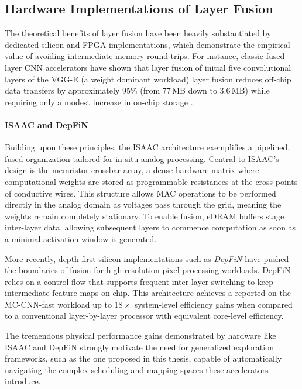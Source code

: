 \subsection{Hardware Implementations of Layer Fusion}

The theoretical benefits of layer fusion have been heavily substantiated by dedicated silicon and FPGA implementations, which demonstrate the empirical value of avoiding intermediate memory round-trips. For instance, classic fused-layer CNN accelerators have shown that layer fusion of initial five convolutional layers of the VGG-E (a weight dominant workload) layer fusion reduces off-chip data transfers by approximately 95\% (from 77\,MB down to 3.6\,MB) while requiring only a modest increase in on-chip storage \cite{alwani2016fusedlayer}.

\paragraph{ISAAC and DepFiN}

Building upon these principles, the ISAAC \cite{shafiee2016isaac} architecture exemplifies a pipelined, fused organization tailored for in-situ analog processing. Central to ISAAC's design is the memristor crossbar array, a dense hardware matrix where computational weights are stored as programmable resistances at the cross-points of conductive wires. This structure allows MAC operations to be performed directly in the analog domain as voltages pass through the grid, meaning the weights remain completely stationary. To enable fusion, eDRAM buffers stage inter-layer data, allowing subsequent layers to commence computation as soon as a minimal activation window is generated.

More recently, depth-first silicon implementations such as \emph{DepFiN} \cite{goetschalckx2023depfin} have pushed the boundaries of fusion for high-resolution pixel processing workloads. DepFiN relies on a control flow that supports frequent inter-layer switching to keep intermediate feature maps on-chip. This architecture achieves a reported on the MC-CNN-fast workload up to $18\times$ system-level efficiency gains when compared to a conventional layer-by-layer processor with equivalent core-level efficiency. 

The tremendous physical performance gains demonstrated by hardware like ISAAC and DepFiN strongly motivate the need for generalized exploration frameworks, such as the one proposed in this thesis, capable of automatically navigating the complex scheduling and mapping spaces these accelerators introduce.

